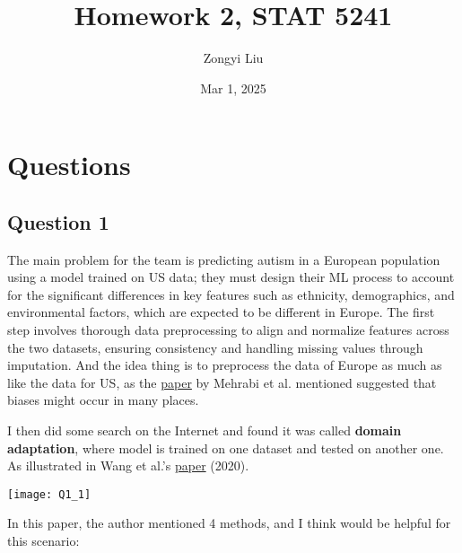 \documentclass[letterpaper]{article}
\title{Homework 2, STAT 5241
}
\author{Zongyi Liu}
\date{Mar 1, 2025}
\begin{document}
		\maketitle
		
		\section{Questions}
		
		\subsection{Question 1}
		
		The main problem for the team is predicting autism in a European population using a model trained on US data; they must design their ML process to account for the significant differences in key features such as ethnicity, demographics, and environmental factors, which are expected to be different in Europe. The first step involves thorough data preprocessing to align and normalize features across the two datasets, ensuring consistency and handling missing values through imputation. And the idea thing is to preprocess the data of Europe as much as like the data for US, as the \href{https://arxiv.org/abs/1908.09635}{paper} by Mehrabi et al. mentioned suggested that biases might occur in many places. 
		
		I then did some search on the Internet and found it was called \textbf{domain adaptation}, where model is trained on one dataset and tested on another one. As illustrated in Wang et al.'s \href{https://pmc.ncbi.nlm.nih.gov/articles/PMC9011180/}{paper} (2020).
		
		 \begin{center}
			\texttt{[image: Q1\_1]}
		\end{center}
		
		In this paper, the author mentioned 4 methods, and I think would be helpful for this scenario:
		
\end{document}
